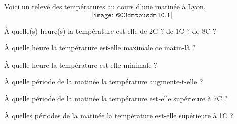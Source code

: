 Voici un relevé des températures au cours d'une matinée à Lyon.
\[\texttt{[image: 603dmtousdm10.1]}\]
\begin{myenumerate}
\item \`A quelle(s) heure(s) la température est-elle de 2\degres C ?
de 1\degres C ? de 8\degres C ?
\item \`A quelle heure la température est-elle maximale ce matin-là ?
\item \`A quelle heure la température est-elle minimale ?
\item \`A quelle période de la matinée la température augmente-t-elle ?
\item \`A quelle période de la matinée la température est-elle
supérieure à 7\degres C ?
\item \`A quelles périodes de la matinée la température est-elle
supérieure à 1\degres C ?
\end{myenumerate}